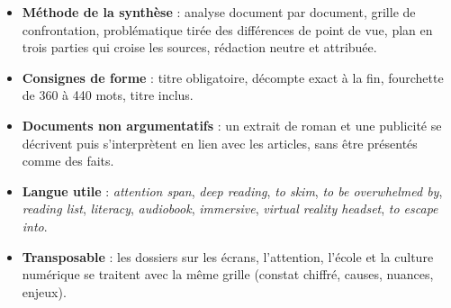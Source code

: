 \documentclass[11pt,a4paper]{article}
\providecommand{\tightlist}{\setlength{\itemsep}{0pt}\setlength{\parskip}{0pt}}
\begin{document}
\begin{itemize}
\tightlist
\item
  \textbf{Méthode de la synthèse} : analyse document par document, grille de confrontation, problématique tirée des différences de point de vue, plan en trois parties qui croise les sources, rédaction neutre et attribuée.
\item
  \textbf{Consignes de forme} : titre obligatoire, décompte exact à la fin, fourchette de 360 à 440 mots, titre inclus.
\item
  \textbf{Documents non argumentatifs} : un extrait de roman et une publicité se décrivent puis s'interprètent en lien avec les articles, sans être présentés comme des faits.
\item
  \textbf{Langue utile} : \emph{attention span}, \emph{deep reading}, \emph{to skim}, \emph{to be overwhelmed by}, \emph{reading list}, \emph{literacy}, \emph{audiobook}, \emph{immersive}, \emph{virtual reality headset}, \emph{to escape into}.
\item
  \textbf{Transposable} : les dossiers sur les écrans, l'attention, l'école et la culture numérique se traitent avec la même grille (constat chiffré, causes, nuances, enjeux).
\end{itemize}
\end{document}
